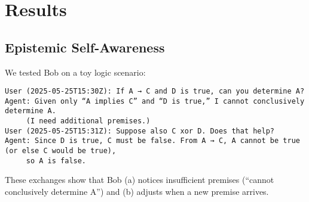 \documentclass[11pt]{article}
\begin{document}
\section{Results}

\subsection{Epistemic Self-Awareness}
We tested Bob on a toy logic scenario:
\begin{verbatim}
User (2025-05-25T15:30Z): If A → C and D is true, can you determine A?
Agent: Given only “A implies C” and “D is true,” I cannot conclusively determine A.
     (I need additional premises.)
User (2025-05-25T15:31Z): Suppose also C xor D. Does that help?
Agent: Since D is true, C must be false. From A → C, A cannot be true (or else C would be true),
     so A is false.
\end{verbatim}
These exchanges show that Bob (a) notices insufficient premises (“cannot conclusively determine A”) and (b) adjusts when a new premise arrives. 
\end{document}

